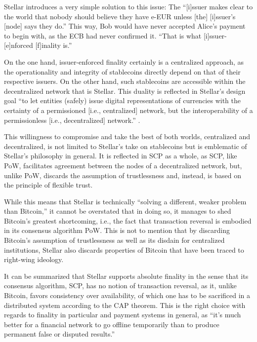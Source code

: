 Stellar introduces a very simple solution to this issue:
The ``[i]ssuer makes clear to the world that nobody should believe they have e-EUR unless [the] [i]ssuer's [node] says they do.'' 
This way, Bob would have never accepted Alice's payment to begin with, as the ECB had never confirmed it.
``That is what [i]ssuer-[e]nforced [f]inality is.''

On the one hand, issuer-enforced finality certainly is a centralized approach, as the operationality and integrity of stablecoins directly depend on that of their respective issuers.
On the other hand, such stablecoins are accessible within the decentralized network that is Stellar.
This duality is reflected in Stellar's design goal ``to let entities (safely) issue digital representations of currencies with the certainty of a permissioned [i.e., centralized] network, but the interoperability of a permissionless [i.e., decentralized] network.'' \autocite{stellar2020ief}.

This willingness to compromise and take the best of both worlds, centralized and decentralized, is not limited to Stellar's take on stablecoins but is emblematic of Stellar's philosophy in general.
It is reflected in SCP as a whole, as SCP, like PoW, facilitates agreement between the nodes of a decentralized network, but, unlike PoW, discards the assumption of trustlessness and, instead, is based on the principle of flexible trust.

While this means that Stellar is technically ``solving a different, weaker problem than Bitcoin,'' \autocite{hackernoon2018cryptocurrencyfinality} it cannot be overstated that in doing so, it manages to shed Bitcoin's greatest shortcoming, i.e., the fact that transaction reversal is embodied in its consensus algorithm PoW.
This is not to mention that by discarding Bitcoin's assumption of trustlessness as well as its disdain for centralized institutions, Stellar also discards properties of Bitcoin that have been traced to right-wing ideology.

It can be summarized that Stellar supports absolute finality in the sense that its consensus algorithm, SCP, has no notion of transaction reversal, as it, unlike Bitcoin, favors consistency over availability, of which one has to be sacrificed in a distributed system according to the CAP theorem.
This is the right choice with regards to finality in particular and payment systems in general, as ``it’s much better for a financial network to go offline temporarily than to produce permanent false or disputed results.'' \autocite{stellar2019networkhalt}

